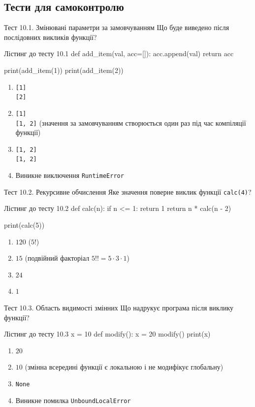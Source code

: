 \subsection*{Тести для самоконтролю}

\begin{pr}{Тест 10.1. Змінювані параметри за замовчуванням}
Що буде виведено після послідовних викликів функції?
\begin{py}{Лістинг до тесту 10.1}
def add_item(val, acc=[]):
    acc.append(val)
    return acc

print(add_item(1))
print(add_item(2))
\end{py}
\begin{enumerate}[label=\textbf{\Alph*.}]
	\item \texttt{[1]} \\ \texttt{[2]}
	\item \texttt{[1]} \\ \texttt{[1, 2]} (значення за замовчуванням створюється один раз під час компіляції функції)
	\item \texttt{[1, 2]} \\ \texttt{[1, 2]}
	\item Виникне виключення \texttt{RuntimeError}
\end{enumerate}
\end{pr}

\begin{pr}{Тест 10.2. Рекурсивне обчислення}
Яке значення поверне виклик функції \texttt{calc(4)}?
\begin{py}{Лістинг до тесту 10.2}
def calc(n):
    if n <= 1:
        return 1
    return n * calc(n - 2)

print(calc(5))
\end{py}
\begin{enumerate}[label=\textbf{\Alph*.}]
	\item $120$ ($5!$)
	\item $15$ (подвійний факторіал $5!! = 5 \cdot 3 \cdot 1$)
	\item $24$
	\item $1$
\end{enumerate}
\end{pr}

\begin{pr}{Тест 10.3. Область видимості змінних}
Що надрукує програма після виклику функції?
\begin{py}{Лістинг до тесту 10.3}
x = 10
def modify():
    x = 20
modify()
print(x)
\end{py}
\begin{enumerate}[label=\textbf{\Alph*.}]
	\item $20$
	\item $10$ (змінна всередині функції є локальною і не модифікує глобальну)
	\item \texttt{None}
	\item Виникне помилка \texttt{UnboundLocalError}
\end{enumerate}
\end{pr}

